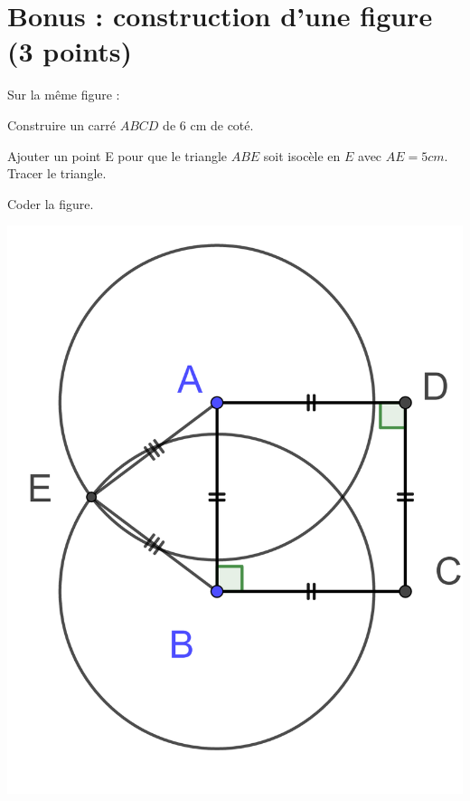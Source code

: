 \section{Bonus : construction d'une figure (3 points)}
Sur la même figure :
\begin{questions}
	
	
	\question[1] Construire un carré $ABCD$ de 6 cm de coté.
	
	\question[1] Ajouter un point E pour que le triangle $ABE$ soit isocèle en $E$ avec $AE = 5 cm$. Tracer le triangle.
	
	\question[1] Coder la figure.
	
	\begin{solution}
		\includegraphics*[scale=0.25]{img/exo4}
	\end{solution}
\end{questions}